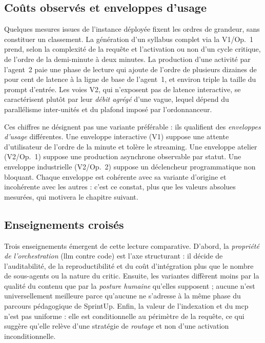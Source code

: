 \subsection{Coûts observés et enveloppes d'usage}
\label{sec:observations}

Quelques mesures issues de l'instance déployée fixent les ordres de
grandeur, sans constituer un classement. La génération d'un syllabus
complet via la V1/Op.~1 prend, selon la complexité de la requête et
l'activation ou non d'un cycle critique, de l'ordre de la
demi-minute à deux minutes. La production d'une activité par
l'agent~2 paie une phase de lecture qui ajoute de l'ordre de
plusieurs dizaines de pour cent de latence à la ligne de base de
l'agent~1, et environ triple la taille du prompt d'entrée. Les voies
V2, qui n'exposent pas de latence interactive, se caractérisent
plutôt par leur \emph{débit agrégé} d'une vague, lequel dépend du
parallélisme inter-unités et du plafond imposé par l'ordonnanceur.

Ces chiffres ne désignent pas une variante préférable : ils
qualifient des \emph{enveloppes d'usage} différentes. Une enveloppe
interactive (V1) suppose une attente d'utilisateur de l'ordre de la
minute et tolère le streaming. Une enveloppe atelier (V2/Op.~1)
suppose une production asynchrone observable par statut. Une
enveloppe industrielle (V2/Op.~2) suppose un déclencheur
programmatique non bloquant. Chaque enveloppe est cohérente avec
sa variante d'origine et incohérente avec les autres : c'est ce
constat, plus que les valeurs absolues mesurées, qui motivera le
chapitre suivant.

\subsection{Enseignements croisés}
\label{sec:enseignements}

Trois enseignements émergent de cette lecture comparative. D'abord,
la \emph{propriété de l'orchestration} (\gls{llm} contre code) est
l'axe structurant : il décide de l'auditabilité, de la
reproductibilité et du coût d'intégration plus que le nombre de
sous-agents ou la nature du critic. Ensuite, les variantes diffèrent
moins par la qualité du contenu que par la \emph{posture humaine}
qu'elles supposent ; aucune n'est universellement meilleure parce
qu'aucune ne s'adresse à la même phase du parcours pédagogique de
SprintUp. Enfin, la valeur de l'indexation et du \gls{mcp} n'est pas
uniforme : elle est conditionnelle au périmètre de la requête, ce
qui suggère qu'elle relève d'une stratégie de \emph{routage} et non
d'une activation inconditionnelle.

